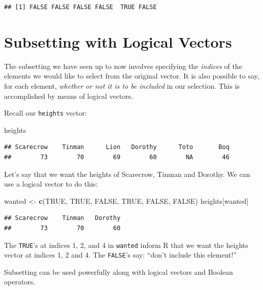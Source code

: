 \documentclass[]{book}
\makeatletter
\newenvironment{Shaded}{\begin{snugshade}}{\end{snugshade}}
\newcommand{\KeywordTok}[1]{\textcolor[rgb]{0.13,0.29,0.53}{\textbf{#1}}}
\newcommand{\StringTok}[1]{\textcolor[rgb]{0.31,0.60,0.02}{#1}}
\newcommand{\OtherTok}[1]{\textcolor[rgb]{0.56,0.35,0.01}{#1}}
\newcommand{\NormalTok}[1]{#1}
\newenvironment{kframe}{%
\medskip{}
\setlength{\fboxsep}{.8em}
 \def\at@end@of@kframe{}%
 \ifinner\ifhmode%
  \def\at@end@of@kframe{\end{minipage}}%
  \begin{minipage}{\columnwidth}%
 \fi\fi%
 \def\FrameCommand##1{\hskip\@totalleftmargin \hskip-\fboxsep
 \colorbox{shadecolor}{##1}\hskip-\fboxsep
     \hskip-\linewidth \hskip-\@totalleftmargin \hskip\columnwidth}%
 \MakeFramed {\advance\hsize-\width
   \@totalleftmargin\z@ \linewidth\hsize
   \@setminipage}}%
 {\par\unskip\endMakeFramed%
 \at@end@of@kframe}
\renewenvironment{Shaded}{\begin{kframe}}{\end{kframe}}
\theoremstyle{definition}
\theoremstyle{definition}
\theoremstyle{definition}
\theoremstyle{remark}
\makeatother
\begin{document}
\begin{verbatim}
## [1] FALSE FALSE FALSE FALSE  TRUE FALSE
\end{verbatim}

\section{Subsetting with Logical
Vectors}\label{subsetting-with-logical-vectors}

The subsetting we have seen up to now involves specifying the
\emph{indices} of the elements we would like to select from the original
vector. It is also possible to say, for each element, \emph{whether or
not it is to be included} in our selection. This is accomplished by
means of logical vectors.

Recall our \texttt{heights} vector:

\begin{Shaded}
\begin{Highlighting}[]
\NormalTok{heights}
\end{Highlighting}
\end{Shaded}

\begin{verbatim}
## Scarecrow    Tinman      Lion   Dorothy      Toto       Boq 
##        73        70        69        60        NA        46
\end{verbatim}

Let's say that we want the heights of Scarecrow, Tinman and Dorothy. We
can use a logical vector to do this:

\begin{Shaded}
\begin{Highlighting}[]
\NormalTok{wanted <-}\StringTok{ }\KeywordTok{c}\NormalTok{(}\OtherTok{TRUE}\NormalTok{, }\OtherTok{TRUE}\NormalTok{, }\OtherTok{FALSE}\NormalTok{, }\OtherTok{TRUE}\NormalTok{, }\OtherTok{FALSE}\NormalTok{, }\OtherTok{FALSE}\NormalTok{)}
\NormalTok{heights[wanted]}
\end{Highlighting}
\end{Shaded}

\begin{verbatim}
## Scarecrow    Tinman   Dorothy 
##        73        70        60
\end{verbatim}

The \texttt{TRUE}'s at indices 1, 2, and 4 in \texttt{wanted} inform R
that we want the heights vector at indices 1, 2 and 4. The
\texttt{FALSE}'s say: ``don't include this element!''

Subsetting can be used powerfully along with logical vectors and Boolean
operators.
\end{document}
